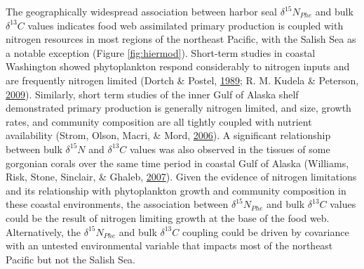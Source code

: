 \documentclass [11pt, proquest] {uwthesis}[2015/03/03]
\begin{document}
The geographically widespread association between harbor seal
\(\delta^{15}N_{Phe}\) and bulk \(\delta^{13}C\) values indicates food
web assimilated primary production is coupled with nitrogen resources in
most regions of the northeast Pacific, with the Salish Sea as a notable
exception (Figure \ref{fig:hiermod}). Short-term studies in coastal
Washington showed phytoplankton respond considerably to nitrogen inputs
and are frequently nitrogen limited (Dortch \& Postel,
\protect\hyperlink{ref-Dortch1989}{1989}; R. M. Kudela \& Peterson,
\protect\hyperlink{ref-Kudela2009}{2009}). Similarly, short term studies
of the inner Gulf of Alaska shelf demonstrated primary production is
generally nitrogen limited, and size, growth rates, and community
composition are all tightly coupled with nutrient availability (Strom,
Olson, Macri, \& Mord, \protect\hyperlink{ref-Strom2006}{2006}). A
significant relationship between bulk \(\delta^{15}N\) and
\(\delta^{13}C\) values was also observed in the tissues of some
gorgonian corals over the same time period in coastal Gulf of Alaska
(Williams, Risk, Stone, Sinclair, \& Ghaleb,
\protect\hyperlink{ref-Williams2007}{2007}). Given the evidence of
nitrogen limitations and its relationship with phytoplankton growth and
community composition in these coastal environments, the association
between \(\delta^{15}N_{Phe}\) and bulk \(\delta^{13}C\) values could be
the result of nitrogen limiting growth at the base of the food web.
Alternatively, the \(\delta^{15}N_{Phe}\) and bulk \(\delta^{13}C\)
coupling could be driven by covariance with an untested environmental
variable that impacts most of the northeast Pacific but not the Salish
Sea.
\end{document}
